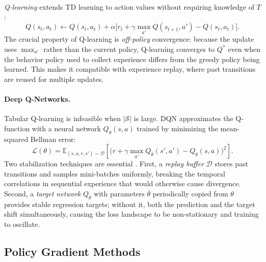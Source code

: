 \emph{Q-learning} \citep{watkins1989learning} extends TD learning to action values without requiring knowledge of $T$:
\begin{equation}
  Q(s_t, a_t) \leftarrow Q(s_t, a_t) + \alpha\bigl[r_t + \gamma \max_{a'} Q(s_{t+1}, a') - Q(s_t, a_t)\bigr].
  \label{eq:qlearning}
\end{equation}
The crucial property of Q-learning is \emph{off-policy} convergence: because the update uses $\max_{a'}$ rather than the current policy, Q-learning converges to $Q^*$ even when the behavior policy used to collect experience differs from the greedy policy being learned. This makes it compatible with experience replay, where past transitions are reused for multiple updates.

\paragraph{Deep Q-Networks.}
Tabular Q-learning is infeasible when $|\mathcal{S}|$ is large. DQN \citep{mnih2015humanlevel} approximates the Q-function with a neural network $Q_\theta(s, a)$ trained by minimizing the mean-squared Bellman error:
\begin{equation}
  \mathcal{L}(\theta) = \mathbb{E}_{(s,a,r,s')\sim\mathcal{D}}\!\left[\bigl(r + \gamma \max_{a'} Q_{\bar\theta}(s', a') - Q_\theta(s,a)\bigr)^2\right].
\end{equation}
Two stabilization techniques are essential \citep{mnih2015humanlevel}. First, a \emph{replay buffer} $\mathcal{D}$ stores past transitions and samples mini-batches uniformly, breaking the temporal correlations in sequential experience that would otherwise cause divergence. Second, a \emph{target network} $Q_{\bar\theta}$ with parameters $\bar\theta$ periodically copied from $\theta$ provides stable regression targets; without it, both the prediction and the target shift simultaneously, causing the loss landscape to be non-stationary and training to oscillate.

\subsection{Policy Gradient Methods}
\label{sec:TheoreticalBackground_PolicyGradient}

